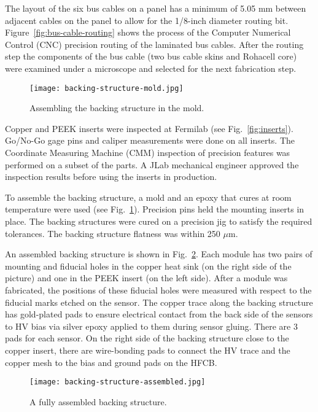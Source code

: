 The layout of the six bus cables on a panel has a minimum of 5.05 mm between adjacent cables on the panel to allow for the 1/8-inch diameter routing bit. Figure~\ref{fig:bus-cable-routing} shows the process of the Computer Numerical Control (CNC) precision routing of the laminated bus cables. After the routing step the components of the bus cable (two bus cable skins and Rohacell core) were examined under a microscope and selected for the next fabrication step. 

\begin{figure}[h] 
\centering 
\texttt{[image: backing-structure-mold.jpg]}
\caption{Assembling the backing structure in the mold.}
\label{fig:backing-structure-mold}
\end{figure}

Copper and PEEK inserts were inspected at Fermilab (see Fig.~\ref{fig:inserts}). Go/No-Go gage pins and caliper measurements were done on all inserts. The Coordinate Measuring Machine (CMM) inspection of precision features was performed on a subset of the parts. A JLab mechanical engineer approved the inspection results before using the inserts in production.

To assemble the backing structure, a mold and an epoxy that cures at room temperature were used (see Fig.~\ref{fig:backing-structure-mold}). Precision pins held the mounting inserts in place. The backing structures were cured on a precision jig to satisfy the required tolerances. The backing structure flatness was within 250 $\mu$m.

An assembled backing structure is shown in Fig.~\ref{fig:backing-structure-assembled}. Each module has two pairs of mounting and fiducial holes in the copper heat sink (on the right side of the picture) and one in the PEEK insert (on the left side). After a module was fabricated, the positions of these fiducial holes were measured with respect to the fiducial marks etched on the sensor. The copper trace along the backing structure has gold-plated pads to ensure electrical contact from the back side of the sensors to HV bias via silver epoxy applied to them during sensor gluing. There are 3 pads for each sensor. On the right side of the backing structure close to the copper insert, there are wire-bonding pads to connect the HV trace and the copper mesh to the bias and ground pads on the HFCB.

\begin{figure}[h] 
\centering 
\texttt{[image: backing-structure-assembled.jpg]}
\caption{A fully assembled backing structure.}
\label{fig:backing-structure-assembled}
\end{figure}


